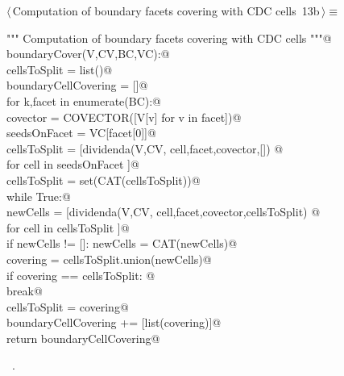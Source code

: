 \documentclass[11pt,oneside]{article}	%
\begin{document}
\begin{flushleft} \small \label{scrap14}
\protect{}$\langle\,$Computation of boundary facets covering with CDC cells\nobreak\ {\footnotesize 13b}$\,\rangle\equiv$
\vspace{-1ex}
\begin{list}{}{} \item
\mbox{}\verb@""" Computation of boundary facets covering with CDC cells """@\\
\mbox{}\verb@def boundaryCover(V,CV,BC,VC):@\\
\mbox{}\verb@   cellsToSplit = list()@\\
\mbox{}\verb@   boundaryCellCovering = []@\\
\mbox{}\verb@   for k,facet in enumerate(BC):@\\
\mbox{}\verb@      covector = COVECTOR([V[v] for v in facet])@\\
\mbox{}\verb@      seedsOnFacet = VC[facet[0]]@\\
\mbox{}\verb@      cellsToSplit = [dividenda(V,CV, cell,facet,covector,[]) @\\
\mbox{}\verb@                     for cell in seedsOnFacet ]@\\
\mbox{}\verb@      cellsToSplit = set(CAT(cellsToSplit))@\\
\mbox{}\verb@      while True:@\\
\mbox{}\verb@         newCells = [dividenda(V,CV, cell,facet,covector,cellsToSplit) @\\
\mbox{}\verb@                     for cell in cellsToSplit ]@\\
\mbox{}\verb@         if newCells != []: newCells = CAT(newCells)@\\
\mbox{}\verb@         covering = cellsToSplit.union(newCells)@\\
\mbox{}\verb@         if covering == cellsToSplit: @\\
\mbox{}\verb@            break@\\
\mbox{}\verb@         cellsToSplit = covering@\\
\mbox{}\verb@      boundaryCellCovering += [list(covering)]@\\
\mbox{}\verb@   return boundaryCellCovering@\\
\mbox{}\verb@@{\NWsep}
\end{list}
\vspace{-1ex}
\footnotesize\addtolength{\baselineskip}{-1ex}
\begin{list}{}{\setlength{\itemsep}{-\parsep}\setlength{\itemindent}{-\leftmargin}}
\item \NWtxtMacroRefIn\ .
\end{list}
\end{flushleft}
\end{document}
